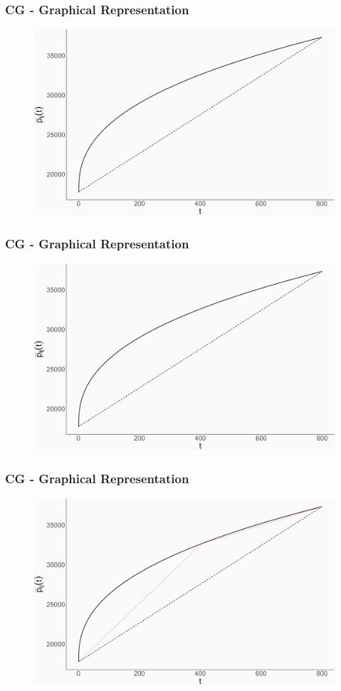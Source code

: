 \documentclass[xcolor=dvipsnames,aspectratio=169, handout, mathserif]{beamer}
\begin{document}
\begin{frame}
\frametitle{CG - Graphical Representation}
\begin{center}
\begin{figure}
    \centering
    \includegraphics[width=0.8\linewidth]{p2.png}
\end{figure}
\end{center}
\end{frame}

\begin{frame}
\frametitle{CG - Graphical Representation}
\begin{center}
\begin{figure}
    \centering
    \includegraphics[width=0.8\linewidth]{p3.png}
\end{figure}
\end{center}
\end{frame}

\begin{frame}
\frametitle{CG - Graphical Representation}
\begin{center}
\begin{figure}
    \centering
    \includegraphics[width=0.8\linewidth]{p4.png}
\end{figure}
\end{center}
\end{frame}
\end{document}

